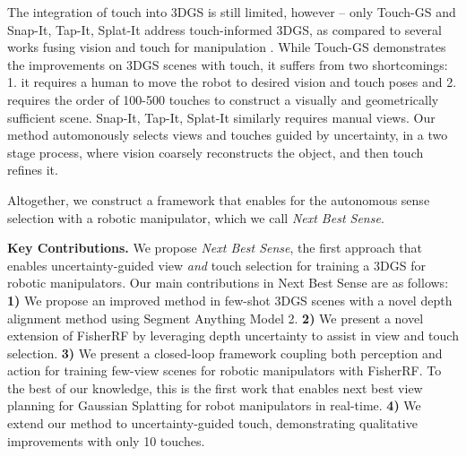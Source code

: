 The integration of touch into \gls{3DGS} is still limited, however -- only  Touch-GS \cite{swann2024touch} and Snap-It, Tap-It, Splat-It \cite{comi2024snap} address touch-informed \gls{3DGS}, as compared to several works fusing vision and touch for manipulation \cite{smith2021active, suresh2023neural,yang2024binding, fu2024touch,watkins2019multi, smith20203d}. While Touch-GS demonstrates the improvements on \gls{3DGS} scenes with touch, it suffers from two shortcomings: 1. it requires a human to move the robot to desired vision and touch poses and 2. requires the order of 100-500 touches to construct a visually and geometrically sufficient scene. Snap-It, Tap-It, Splat-It similarly requires manual views. Our method automonously selects views and touches guided by uncertainty, in a two stage process, where vision coarsely reconstructs the object, and then touch refines it.


Altogether, we construct a framework that enables for the autonomous sense selection with a robotic manipulator, which we call \textit{Next Best Sense}.



\noindent \textbf{Key Contributions.} We propose \textit{Next Best Sense}, the first approach that enables uncertainty-guided view \textit{and} touch selection for training a \gls*{3DGS} for robotic manipulators. Our main contributions in Next Best Sense are as follows:
\textbf{1)} We propose an improved method in few-shot \gls{3DGS} scenes with a novel depth alignment method using Segment Anything Model 2.
\textbf{2) }We present a novel extension of FisherRF by leveraging depth uncertainty to assist in view and touch selection.
\textbf{3)} We present a closed-loop framework coupling both perception and action for training few-view scenes for robotic manipulators with FisherRF. To the best of our knowledge, this is the first work that enables next best view planning for Gaussian Splatting for robot manipulators in real-time. 
\textbf{4)} We extend our method to uncertainty-guided touch, demonstrating qualitative improvements with only 10 touches.



